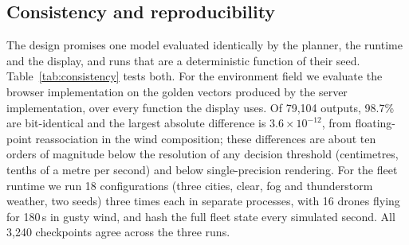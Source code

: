 





\subsection{Consistency and reproducibility}\label{sec:eval:consistency}

The design promises one model evaluated identically by the planner, the runtime and the display, and runs that are a
deterministic function of their seed. Table~\ref{tab:consistency} tests both. For the environment field we evaluate the
browser implementation on the golden vectors produced by the server implementation, over every function the display
uses. Of 79,104 outputs, 98.7\% are bit-identical and the largest absolute difference is $3.6\times10^{-12}$, from
floating-point reassociation in the wind composition; these differences are about ten orders of magnitude below the resolution of any decision threshold
(centimetres, tenths of a metre per second) and below single-precision rendering. For the fleet
runtime we run 18 configurations (three cities, clear, fog and thunderstorm weather, two seeds) three times each in
separate processes, with 16 drones flying for 180\,s in gusty wind, and hash the full fleet state every simulated
second. All 3,240 checkpoints agree across the three runs.


